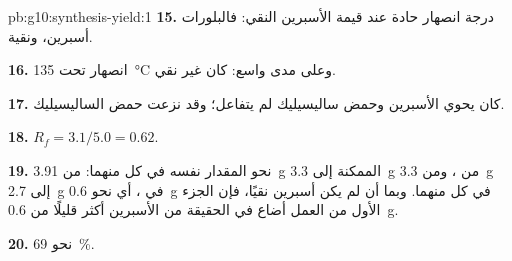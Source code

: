 \begin{solution}{pb:g10:synthesis-yield:1}
\textbf{15.} درجة انصهار حادة عند قيمة الأسبرين النقي: فالبلورات أسبرين،
ونقية.

\textbf{16.} انصهار تحت \qty{135}{\celsius} وعلى مدى واسع: 
كان غير نقي.

\textbf{17.} كان  يحوي الأسبرين وحمض ساليسيليك لم يتفاعل؛ وقد نزعت
 حمض الساليسيليك.

\textbf{18.} $R_f = 3.1 / 5.0 = 0.62$.

\textbf{19.} نحو المقدار نفسه في كل منهما: من \qty{3.91}{g} الممكنة إلى
\qty{3.3}{g} من ، ومن \qty{3.3}{g} إلى \qty{2.7}{g} في
، أي نحو \qty{0.6}{g} في كل منهما. وبما أن  لم يكن
أسبرين نقيًا، فإن الجزء الأول من العمل أضاع في الحقيقة من الأسبرين أكثر قليلًا
من \qty{0.6}{g}.

\textbf{20.}   نحو \qty{69}{\percent}.
\end{solution}
